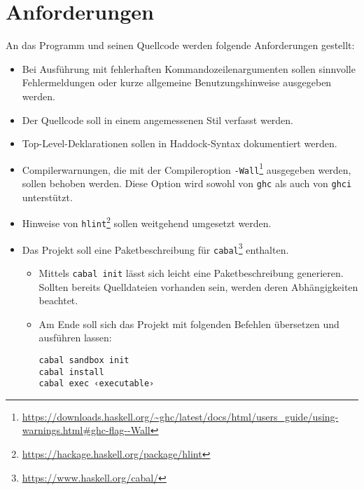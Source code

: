\documentclass{scrartcl}
\begin{document}
\section*{Anforderungen}
\label{sec:org025f859}

An das Programm und seinen Quellcode werden folgende Anforderungen gestellt:
\begin{itemize}
\item Bei Ausführung mit fehlerhaften Kommandozeilenargumenten sollen sinnvolle Fehlermeldungen oder kurze allgemeine Benutzungshinweise ausgegeben werden.
\item Der Quellcode soll in einem angemessenen Stil verfasst werden.
\item Top-Level-Deklarationen sollen in Haddock-Syntax dokumentiert werden.
\item Compilerwarnungen, die mit der Compileroption \texttt{-Wall}\footnote{\url{https://downloads.haskell.org/\~ghc/latest/docs/html/users\_guide/using-warnings.html\#ghc-flag--Wall}} ausgegeben werden, sollen behoben werden. Diese Option wird sowohl von \texttt{ghc} als auch von \texttt{ghci} unterstützt.
\item Hinweise von \texttt{hlint}\footnote{\url{https://hackage.haskell.org/package/hlint}} sollen weitgehend umgesetzt werden.
\item Das Projekt soll eine Paketbeschreibung für \texttt{cabal}\footnote{\url{https://www.haskell.org/cabal/}} enthalten.
\begin{itemize}
\item Mittels \texttt{cabal init} lässt sich leicht eine Paketbeschreibung generieren.  Sollten bereits Quelldateien vorhanden sein, werden deren Abhängigkeiten beachtet.
\item Am Ende soll sich das Projekt mit folgenden Befehlen übersetzen und ausführen lassen:
\begin{verbatim}
cabal sandbox init
cabal install
cabal exec ‹executable›
\end{verbatim}
\end{itemize}
\end{itemize}




\end{document}

